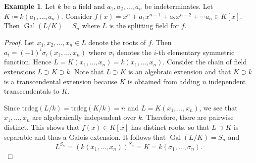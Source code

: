 \documentclass[10pt,letterpaper,cm]{nupset}
\theoremstyle{definition}
\newtheorem{exmp}[definition]{Example}
\theoremstyle{theorem}
\theoremstyle{remark}
\newcommand{\1}{\mathbf{1}}
\newcommand{\0}{\vec 0}
\DeclareMathOperator{\gal}{Gal}
\begin{document}
\begin{exmp}
Let $k$ be a field and $a_1, a_2, \ldots, a_n$ be indeterminates.  Let $K\coloneqq  k(a_1, \ldots, a_n)$. Consider $f(x) = x^n + a_1x^{n-1} + a_2x^{n-2} + \cdots a_n \in K[x]$. Then $\gal(L/K) = S_n$ where $L$ is the splitting field for $f$.
\end{exmp}
\begin{proof}
Let $x_1, x_2, \ldots, x_n \in L$ denote the roots of $f$. Then $a_i = ({-}1)^i\sigma_i(x_1, \ldots, x_n)$ where $\sigma_i$ denotes the $i$-th elementary symmetric function. Hence $L = K(x_1, \ldots, x_n) = k(x_1, \ldots, x_n)$. Consider the chain of field extensions $L \supset K \supset k$. Note that $L \supset K$ is an algebraic extension and that $K \supset k$ is a transcendental extension because $K$ is obtained from adding $n$ independent transcendentals to $K$.

\medskip

 
Since $\text{trdeg}(L/k) = \text{trdeg}(K/k) = n$ and $L = K(x_1, \ldots, x_n)$, we see that $x_1, \ldots, x_n$ are algebraically independent over $k$.  Therefore, there are pairwise distinct. This shows that $f(x) \in K[x]$ has distinct roots, so that $L\supset K$ is separable and thus a Galois extension. It follows that $\gal(L/K) = S_n$ and $$L^{S_n}= (k(x_1, \ldots, x_n))^{S_n}= K =k(\sigma_1, \ldots, \sigma_n).$$
\end{proof}
\end{document}
